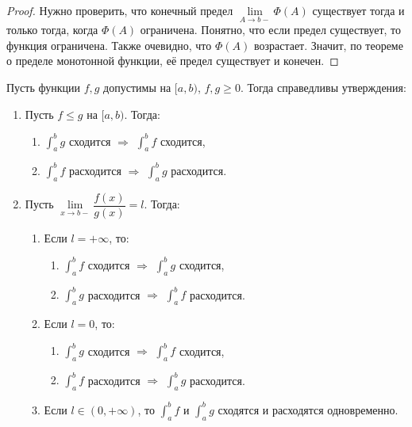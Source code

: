 \begin{proof}
	Нужно проверить, что конечный предел \(\lim\limits_{A \to b-} \Phi(A)\) существует тогда и только тогда, когда \(\Phi(A)\) ограничена. Понятно, что если предел существует, то функция ограничена. Также очевидно, что \(\Phi(A)\) возрастает. Значит, по теореме о пределе монотонной функции, её предел существует и конечен. 
\end{proof}

\hypertarget{priz}{}
\begin{theorem}
	Пусть функции \(f, g\) допустимы на \([a, b)\), \(f, g \geqslant 0\). Тогда справедливы утверждения:
	\begin{enumerate}
		\item Пусть \(f \leqslant g\) на \([a, b)\). Тогда:
		\begin{enumerate}
				\item \(\int_a^b g\) сходится \(\Rightarrow\) \(\int_a^b f\) сходится,
			\item \(\int_a^b f\) расходится \(\Rightarrow\) \(\int_a^b g\) расходится.
		\end{enumerate}
		\item Пусть \(\lim\limits_{x \to b-} \dfrac{f(x)}{g(x)} = l\). Тогда:
		\begin{enumerate}
			\item Если \(l = +\infty\), то:
			\begin{enumerate}
				\item \(\int_a^b f\) сходится \(\Rightarrow\) \(\int_a^b g\) сходится,
				\item \(\int_a^b g\) расходится \(\Rightarrow\) \(\int_a^b f\) расходится.
			\end{enumerate}
			\item Если \(l = 0\), то:
			\begin{enumerate}
				\item \(\int_a^b g\) сходится \(\Rightarrow\) \(\int_a^b f\) сходится,
				\item \(\int_a^b f\) расходится \(\Rightarrow\) \(\int_a^b g\) расходится.
			\end{enumerate}
			\item Если \(l \in (0, +\infty)\), то \(\int_a^b f\) и \(\int_a^b g\) сходятся и расходятся одновременно.
		\end{enumerate}
	\end{enumerate}
\end{theorem}

